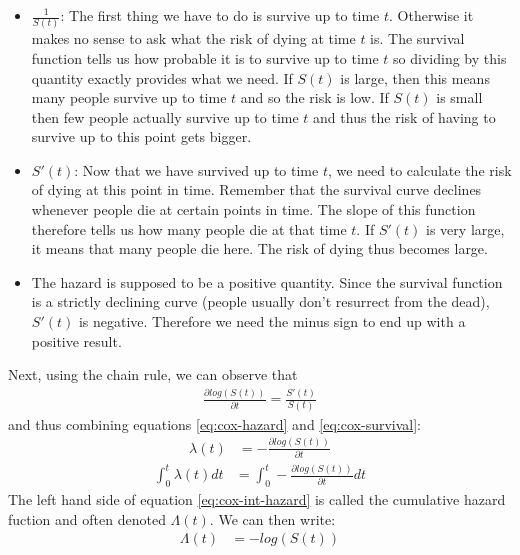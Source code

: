\begin{itemize}
	\item $\frac{1}{S(t)}$: The first thing we have to do is survive up to time $t$. Otherwise it makes no sense to ask what the risk of dying at time $t$ is. The survival function tells us how probable it is to survive up to time $t$ so dividing by this quantity exactly provides what we need. If $S(t)$ is large, then this means many people survive up to time $t$ and so the risk is low. If $S(t)$ is small then few people actually survive up to time $t$ and thus the risk of having to survive up to this point gets bigger.
	\item $S'(t)$: Now that we have survived up to time $t$, we need to calculate the risk of dying at this point in time. Remember that the survival curve declines whenever people die at certain points in time. The slope of this function therefore tells us how many people die at that time $t$. If $S'(t)$ is very large, it means that many people die here. The risk of dying thus becomes large.
	\item The hazard is supposed to be a positive quantity. Since the survival function is a strictly declining curve (people usually don't resurrect from the dead), $S'(t)$ is negative. Therefore we need the minus sign to end up with a positive result.
\end{itemize}
Next, using the chain rule, we can observe that
\begin{equation}
\begin{split}
\label{eq:cox-survival}
\frac{\partial log(S(t))}{\partial t} = \frac{S'(t)}{S(t)}
\end{split}
\end{equation}
and thus combining equations \ref{eq:cox-hazard} and \ref{eq:cox-survival}:
\begin{equation}
\begin{split}
\lambda(t) &= -\frac{\partial log(S(t))}{\partial t}
\end{split}
\end{equation}
\begin{equation}
\begin{split}
\label{eq:cox-int-hazard}
\int_{0}^{t}\lambda(t)dt &= \int_{0}^{t}-\frac{\partial log(S(t))}{\partial t}dt
\end{split}
\end{equation}
The left hand side of equation \ref{eq:cox-int-hazard} is called the cumulative hazard fuction and often denoted $\Lambda(t)$. We can then write:
\begin{equation}
\begin{split}
\Lambda(t) &= -log(S(t))
\end{split}
\end{equation}
